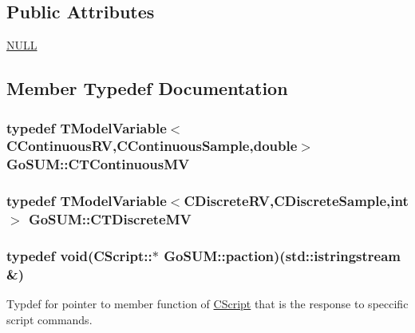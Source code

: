 \subsection*{Public Attributes}
\begin{DoxyCompactItemize}
\item 
\hyperlink{struct_go_s_u_m_a3e6605d298c4dcd991f606a654a6cae4}{N\-U\-L\-L}
\end{DoxyCompactItemize}


\subsection{Member Typedef Documentation}
\hypertarget{struct_go_s_u_m_aa0c068def5d06781c14bbf6cc0074c56}{
\subsubsection[{C\-T\-Continuous\-M\-V}]{\setlength{\rightskip}{0pt plus 5cm}typedef {\bf T\-Model\-Variable}$<${\bf C\-Continuous\-R\-V},{\bf C\-Continuous\-Sample},double$>$ {\bf Go\-S\-U\-M\-::\-C\-T\-Continuous\-M\-V}}}\label{struct_go_s_u_m_aa0c068def5d06781c14bbf6cc0074c56}
\hypertarget{struct_go_s_u_m_a01b6cebf4ea9040d57b9f38e5eb08dc6}{
\subsubsection[{C\-T\-Discrete\-M\-V}]{\setlength{\rightskip}{0pt plus 5cm}typedef {\bf T\-Model\-Variable}$<${\bf C\-Discrete\-R\-V},{\bf C\-Discrete\-Sample},int$>$ {\bf Go\-S\-U\-M\-::\-C\-T\-Discrete\-M\-V}}}\label{struct_go_s_u_m_a01b6cebf4ea9040d57b9f38e5eb08dc6}
\hypertarget{struct_go_s_u_m_a66b78848987ba5d005b4e86b8a1aef37}{
\subsubsection[{paction}]{\setlength{\rightskip}{0pt plus 5cm}typedef void(C\-Script\-::$\ast$ Go\-S\-U\-M\-::paction)(std\-::istringstream \&)}}\label{struct_go_s_u_m_a66b78848987ba5d005b4e86b8a1aef37}


Typdef for pointer to member function of \hyperlink{class_go_s_u_m_1_1_c_script}{C\-Script} that is the response to speccific script commands. 



